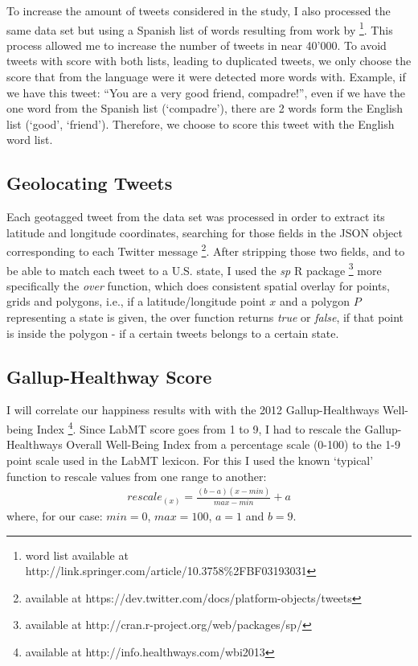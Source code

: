 \documentclass{llncs}
\begin{document}
To increase the amount of tweets considered in the study, I also processed the same data set but using a Spanish list of words resulting from work by \cite{Redondo2007} \footnote{word list available at http://link.springer.com/article/10.3758\%2FBF03193031}. This process allowed me to increase the number of tweets in near 40'000. To avoid tweets with score with both lists, leading to duplicated tweets, we only choose the score that from the language were it were detected more words with. Example, if we have this tweet: ``You are a very good friend, compadre!'', even if we have the one word from the Spanish list (`compadre'), there are 2 words form the English list (`good', `friend'). Therefore, we choose to score this tweet with the English word list.


\subsection{Geolocating Tweets}
\label{sec:meth2}
Each geotagged tweet from the data set was processed in order to extract its latitude and longitude coordinates, searching for those
fields in the JSON object corresponding to each Twitter message \footnote{available at https://dev.twitter.com/docs/platform-objects/tweets}. After stripping those two fields, and to be able to match each tweet to a U.S. state, I used the \emph{sp} R package \footnote{available at http://cran.r-project.org/web/packages/sp/} more specifically the \emph{over} function, which does consistent spatial overlay for points, grids and polygons, i.e., if a latitude/longitude point $x$ and a polygon $P$ representing a state is given, the over function returns \emph{true} or \emph{false}, if that point is inside the polygon - if a certain tweets belongs to a certain state.


\subsection{Gallup-Healthway Score}
\label{sec:meth3}
I will correlate our happiness results with with the 2012 Gallup-Healthways Well-being Index \cite{GallupHealthway2013} \footnote{available at http://info.healthways.com/wbi2013}. Since LabMT score goes from 1 to 9, I had to rescale the Gallup-Healthways Overall Well-Being Index from a percentage scale (0-100) to the 1-9 point scale used in the LabMT lexicon. For this I used the known `typical' function to rescale values from one range to another:
\begin{align*}
rescale_(x) = \frac{(b-a)(x-min)}{max-min} + a \tag{2}\label{eq:2}
\end{align*}
where, for our case: $min = 0$, $max = 100$, $a = 1$ and $b = 9$.
\end{document}
